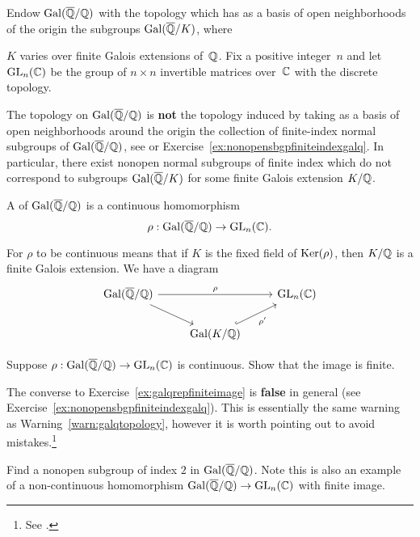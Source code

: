 Endow $\operatorname{Gal}(\overline{\mathbb{Q}}/\mathbb{Q})$ with the topology which has as a basis of open neighborhoods
of the origin the subgroups $\operatorname{Gal}(\overline{\mathbb{Q}}/K)$, where~{$K$ varies
over finite Galois extensions of~$\mathbb{Q}$.
Fix a positive integer~$n$ and let $\operatorname{GL}_n(\mathbb{C})$ be the group of
$n\times n$ invertible matrices over~$\mathbb{C}$ with the discrete topology.

\begin{warning}\label{warn:galqtopology}
	The topology on $\operatorname{Gal}(\overline{\mathbb{Q}}/\mathbb{Q})$ is {\bf not} the topology induced
	by taking as a basis of open neighborhoods around the origin
	the collection of finite-index normal subgroups of $\operatorname{Gal}(\overline{\mathbb{Q}}/\mathbb{Q})$,
	see \cite[Ch.~7]{milne:FT} or Exercise~\ref{ex:nonopensbgpfiniteindexgalq}.
	In particular, there exist nonopen normal subgroups of finite index which
	do not correspond to subgroups $\operatorname{Gal}(\overline{\mathbb{Q}}/K)$ for some finite Galois
	extension $K/\mathbb{Q}$.
\end{warning}

\begin{definition}
	A  of $\operatorname{Gal}(\overline{\mathbb{Q}}/\mathbb{Q})$
	is a continuous homomorphism
	$$
		\rho:\operatorname{Gal}(\overline{\mathbb{Q}}/\mathbb{Q})\to \operatorname{GL}_n(\mathbb{C}).
	$$
\end{definition}
For $\rho$ to be continuous means that if $K$ is the fixed
field of $\operatorname{Ker}(\rho)$, then $K/\mathbb{Q}$ is a finite Galois extension.
We have a diagram
$$
	\begin{tikzcd}
		\galq \arrow{rr}{\rho} \arrow{dr} & & \GL_n(\C) \\
		& \Gal(K/\Q) \arrow[hook]{ur}[swap]{\rho'}
	\end{tikzcd}
$$

\begin{exercise}\label{ex:galqrepfiniteimage}
	Suppose $\rho:\operatorname{Gal}(\overline{\mathbb{Q}}/\mathbb{Q})\to\operatorname{GL}_n(\mathbb{C})$ is continuous.
	Show that the image is finite.
\end{exercise}

\begin{remark}
	The converse to Exercise~\ref{ex:galqrepfiniteimage}
	is \textbf{false} in general (see
	Exercise~\ref{ex:nonopensbgpfiniteindexgalq}).
	This is essentially the same warning as
	Warning~\ref{warn:galqtopology}, however it is worth
	pointing out to avoid mistakes.\footnote{
	See \cite[pg.~1]{artinconjectureLectureNotes}.}
\end{remark}

\begin{exercise}\label{ex:nonopensbgpfiniteindexgalq}
	Find a nonopen subgroup of index $2$ in $\operatorname{Gal}(\overline{\mathbb{Q}}/\mathbb{Q})$.
	Note this is also an example of a non-continuous
	homomorphism $\operatorname{Gal}(\overline{\mathbb{Q}}/\mathbb{Q})\to\operatorname{GL}_n(\mathbb{C})$ with finite image.
	

\end{exercise}}
